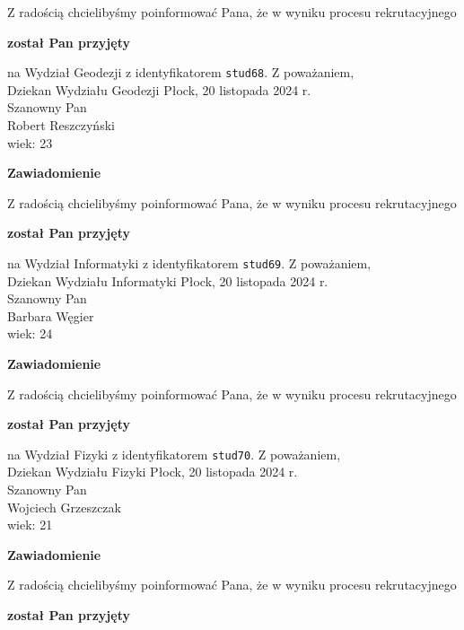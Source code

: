 \documentclass[12pt,a4paper]{article}
\begin{document}
\bigskip
Z radością chcielibyśmy poinformować Pana, że w wyniku procesu rekrutacyjnego 
\begin{center}
\textsf{\textbf{został Pan przyjęty}} 
\end{center}
na Wydział Geodezji z identyfikatorem \verb|stud68|. 
\vspace{2cm}
\noindent
Z poważaniem,\\
Dziekan
Wydziału Geodezji
\newpage
\hfill Płock, 20 listopada 2024 r.\\
\noindent 
Szanowny Pan \\
Robert Reszczyński \\
wiek: 23
\bigskip
\begin{center}
 	{\Large\textbf{Zawiadomienie}}
\end{center}
\bigskip
Z radością chcielibyśmy poinformować Pana, że w wyniku procesu rekrutacyjnego 
\begin{center}
\textsf{\textbf{został Pan przyjęty}} 
\end{center}
na Wydział Informatyki z identyfikatorem \verb|stud69|. 
\vspace{2cm}
\noindent
Z poważaniem,\\
Dziekan
Wydziału Informatyki
\newpage
\hfill Płock, 20 listopada 2024 r.\\
\noindent 
Szanowny Pan \\
Barbara Węgier \\
wiek: 24
\bigskip
\begin{center}
 	{\Large\textbf{Zawiadomienie}}
\end{center}
\bigskip
Z radością chcielibyśmy poinformować Pana, że w wyniku procesu rekrutacyjnego 
\begin{center}
\textsf{\textbf{został Pan przyjęty}} 
\end{center}
na Wydział Fizyki z identyfikatorem \verb|stud70|. 
\vspace{2cm}
\noindent
Z poważaniem,\\
Dziekan
Wydziału Fizyki
\newpage
\hfill Płock, 20 listopada 2024 r.\\
\noindent 
Szanowny Pan \\
Wojciech Grzeszczak \\
wiek: 21
\bigskip
\begin{center}
 	{\Large\textbf{Zawiadomienie}}
\end{center}
\bigskip
Z radością chcielibyśmy poinformować Pana, że w wyniku procesu rekrutacyjnego 
\begin{center}
\textsf{\textbf{został Pan przyjęty}} 
\end{center}
\end{document}
